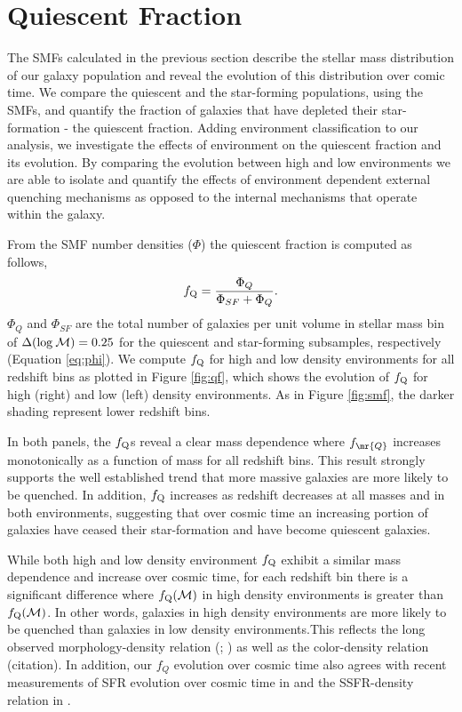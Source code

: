 \documentclass{emulateapj}
\begin{document}
\section{Quiescent Fraction} \label{sec:qf_const}
The SMFs calculated in the previous section describe the stellar mass distribution of our galaxy population and reveal the evolution of this distribution over comic time. We compare the quiescent and the star-forming populations, using the SMFs, and quantify the fraction of galaxies that have depleted their star-formation - the quiescent fraction. Adding environment classification to our analysis, we investigate the effects of environment on the quiescent fraction and its evolution. By comparing the evolution between high and low environments we are able to isolate and quantify the effects of environment dependent external quenching mechanisms as opposed to the internal mechanisms that operate within the galaxy. 

From the SMF number densities ($\Phi$) the quiescent fraction is computed as follows, 
\begin{equation}
f_{\rm{Q}} = \frac{\Phi_{Q}}{\Phi_{SF}+\Phi_{Q}}.
\end{equation}
$\Phi_{Q}$ and $\Phi_{SF}$ are the total number of galaxies per unit volume in stellar mass bin of $\Delta(\rm{log} \: \mathcal{M}) = 0.25$ for the quiescent and star-forming subsamples, respectively (Equation \ref{eq:phi}). We compute $f_{\rm{Q}}$ for high and low density environments for all redshift bins as plotted in Figure \ref{fig:qf}, which shows the evolution of $f_{\rm{Q}}$ for high (right) and low (left) density environments. As in Figure \ref{fig:smf}, the darker shading represent lower redshift bins. 

In both panels, the $f_{\rm{Q}}$s reveal a clear mass dependence where $f_{\mr{Q}}$ increases monotonically as a function of mass for all redshift bins. This result strongly supports the well established trend that more massive galaxies are more likely to be quenched. In addition, $f_{\rm{Q}}$ increases as redshift decreases at all masses and in both environments, suggesting that over cosmic time an increasing portion of galaxies have ceased their star-formation and have become quiescent galaxies. 

While both high and low density environment $f_{\rm{Q}}$ exhibit a similar mass dependence and increase over cosmic time, for each redshift bin there is a significant difference where $f_{\rm{Q}}(\mathcal{M})$ in high density environments is greater than $f_{\rm{Q}}(\mathcal{M})$. In other words, galaxies in high density environments are more likely to be quenched than galaxies in low density environments.This reflects the long observed morphology-density relation (\cite{dresseler84a}; \cite{desai07a}) as well as the color-density relation (citation). In addition, our $f_{Q}$ evolution over cosmic time also agrees with recent measurements of SFR evolution over cosmic time in \cite{Alberts:2014aa} and the SSFR-density relation in \cite{cooper08a}. 
\end{document}

